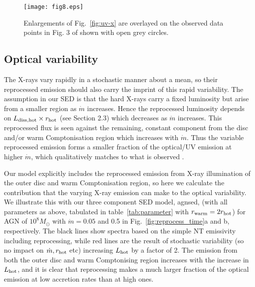 \documentclass[a4paper,fleqn,usenatbib]{mnras}
\begin{document}
\begin{figure*}
\texttt{[image: fig8.eps]}
    \caption{Enlargements of Fig.~\ref{fig:uv-x} are overlayed on the observed data points in Fig. 3 of \citet{lusso2017} shown with open grey circles.}
    \label{fig:uv-x_lusso}
\end{figure*}

\subsection{Optical variability}
\label{sec:reprocess}

The X-rays vary
rapidly in a stochastic manner about a mean, so their reprocessed
emission should also carry the imprint of this rapid variability. 
The assumption in our SED is that the hard X-rays carry a fixed
luminosity but arise from a smaller region as $\dot{m}$ increases. 
Hence the reprocessed luminosity 
depends on $L_{\rm diss, hot} \times r_{\rm hot}$ (see Section 2.3) 
which decreases as  $\dot{m}$ increases. 
This reprocessed flux is seen against 
the remaining, constant component from the disc and/or warm Comptonisation region 
which increases with $\dot{m}$. Thus the variable
reprocessed emission forms a smaller fraction of the optical/UV
emission at higher $\dot{m}$, which qualitatively matches to what is
observed \citep{macleod2010,ai2013,simm2016,kozlowski2016}.  

Our model explicitly includes the reprocessed emission from X-ray
illumination of the outer disc and warm Comptonisation region, so here
we calculate the contribution that the varying X-ray emission can make
to the optical variability.  We illustrate this with our three
component SED model, {\sc agnsed}, (with all parameters as above, tabulated in 
table~\ref{tab:parameter} with $r_{\rm warm}=2r_{\rm hot}$) for AGN of $10^8M_\odot$ with
$\dot{m}=0.05$ and 0.5 in Fig.~\ref{fig:reprocess_time}a and b,
respectively.  The black lines show spectra based on the simple
NT emissivity including reprocessing, while red lines are the result of
stochastic variability (so no impact on $\dot{m}, r_{\rm hot}$ etc) 
increasing $L_{\rm hot}$ by a factor of 2.  The
emission from both the outer disc and warm Comptonising region
increases with the increase in $L_{\rm hot}$, and it is clear that
reprocessing makes a much larger fraction of the optical emission at
low accretion rates than at high ones.
\end{document}
